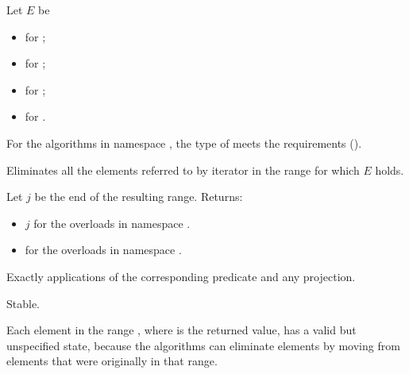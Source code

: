 \begin{itemdescr}
\pnum
Let $E$ be
\begin{itemize}
\item {} for ;
\item {} for ;
\item {} for ;
\item {} for .
\end{itemize}

\pnum
\expects
For the algorithms in namespace ,
the type of 
meets the  requirements ().

\pnum
\effects
Eliminates all the elements referred to by iterator 
in the range  for which $E$ holds.

\pnum
\returns
Let $j$ be the end of the resulting range. Returns:
\begin{itemize}
\item $j$ for the overloads in namespace .
\item {} for the overloads in namespace .
\end{itemize}

\pnum
\complexity
Exactly  applications
of the corresponding predicate and any projection.

\pnum
\remarks
Stable.

\pnum
\begin{note}
Each element in the range ,
where  is the returned value,
has a valid but unspecified state,
because the algorithms can eliminate elements
by moving from elements that were originally in that range.
\end{note}
\end{itemdescr}

